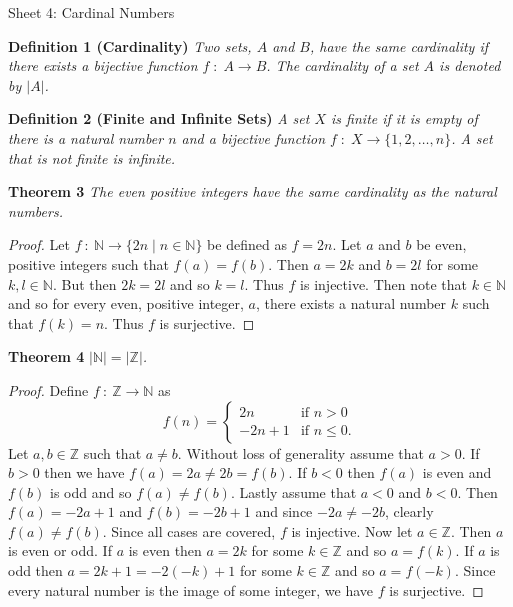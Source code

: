 \documentclass{article}
\begin{document}
\begin{flushleft}

\Large

Sheet 4: Cardinal Numbers\newline

\normalsize

\textbf{Definition 1 (Cardinality)}
\textsl{Two sets, $A$ and $B$, have the same cardinality if there exists a bijective function $f \; : \; A \rightarrow B$. The cardinality of a set $A$ is denoted by $|A|$.}
\newline

\textbf{Definition 2 (Finite and Infinite Sets)}
\textsl{A set $X$ is finite if it is empty of there is a natural number $n$ and a bijective function $f \; : \; X \rightarrow \{1,2, \dots ,n\}$. A set that is not finite is infinite.}
\newline

\textbf{Theorem 3}
\textsl{The even positive integers have the same cardinality as the natural numbers.}
\begin{proof}
Let $f \: : \: \mathbb{N} \rightarrow \{2n \mid n \in \mathbb{N}\}$ be defined as $f=2n$. Let $a$ and $b$ be even, positive integers such that $f(a)=f(b)$. Then $a=2k$ and $b=2l$ for some $k,l \in \mathbb{N}$. But then $2k=2l$ and so $k=l$. Thus $f$ is injective. Then note that $k \in \mathbb{N}$ and so for every even, positive integer, $a$, there exists a natural number $k$ such that $f(k)=n$. Thus $f$ is surjective.
\end{proof}

\textbf{Theorem 4}
\textsl{$|\mathbb{N}|=|\mathbb{Z}|$.}
\begin{proof}
Define $f \: : \: \mathbb{Z} \rightarrow \mathbb{N}$ as
\[
f(n)=
\begin{cases}
2n & \text{if } n>0 \\
-2n+1 & \text{if } n \leq 0.
\end{cases}
\]
Let $a,b \in \mathbb{Z}$ such that $a \neq b$. Without loss of generality assume that $a > 0$. If $b > 0$ then we have $f(a)=2a \neq 2b=f(b)$. If $b<0$ then $f(a)$ is even and $f(b)$ is odd and so $f(a) \neq f(b)$. Lastly assume that $a<0$ and $b<0$. Then $f(a)=-2a+1$ and $f(b)=-2b+1$ and since $-2a \neq -2b$, clearly $f(a) \neq f(b)$. Since all cases are covered, $f$ is injective. Now let $a \in \mathbb{Z}$. Then $a$ is even or odd. If $a$ is even then $a=2k$ for some $k \in \mathbb{Z}$ and so $a=f(k)$. If $a$ is odd then $a=2k+1=-2(-k)+1$ for some $k \in \mathbb{Z}$ and so $a=f(-k)$. Since every natural number is the image of some integer, we have $f$ is surjective.
\end{proof}


\end{flushleft}
\end{document}
